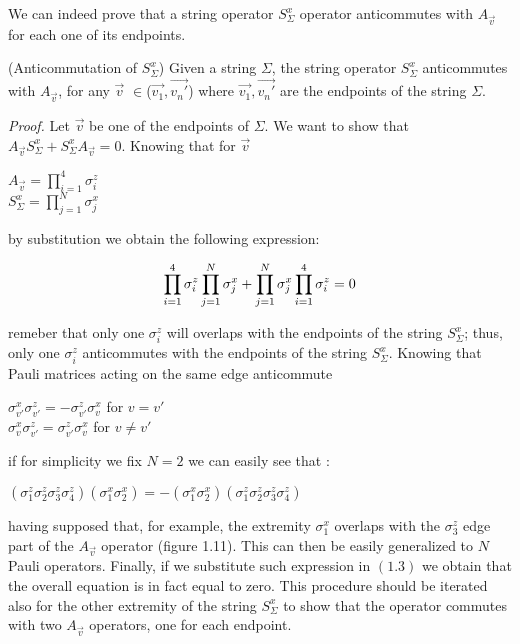 \documentclass{Configuration_Files/PoliMi3i_thesis}
\begin{document}
We can indeed prove that a string operator $S^x_\Sigma$ operator anticommutes with $A_{\vec{v}} $ for each one of its endpoints. 

\begin{proposition}(Anticommutation of $S^x_\Sigma$)
	Given a string $\Sigma$, the string operator $S^x_\Sigma$ anticommutes with $A_{\vec{v}} $, for any $\vec{v}$ $\in$($\vec{v_1},\vec{v_n'}$) where $\vec{v_1},\vec{v_n'}$ are the endpoints of the string $\Sigma$.
\end{proposition}

\textit{Proof.}\newline
Let $\vec{v}$ be one of the endpoints of $\Sigma$. We want to show that $A_{\vec{v}} S^x_\Sigma + S^x_\Sigma A_{\vec{v}}=0$. Knowing that for $\vec{v}$

\begin{center}
	$A_{\vec{v}} = \prod_{i=1}^{4} \sigma_i^z$ \\ 
	$S^x_\Sigma = \prod_{j=1}^{N} \sigma_j^x$
\end{center}

by substitution we obtain the following expression: 

\begin{equation}
	\space\prod_{i=1}^{4} \sigma_i^z \prod_{j=1}^{N} \sigma_j^x + \prod_{j=1}^{N} \sigma_j^x \prod_{i=1}^{4} \sigma_i^z = 0  
\end{equation}

remeber that only one $\sigma_i^z$ will overlaps with the endpoints of the string $S^x_\Sigma$; thus, only one $\sigma_i^z$ anticommutes with the endpoints of the string $S^x_\Sigma$. Knowing that Pauli matrices acting on the same edge anticommute

\begin{center}
	$\sigma_{v'}^x \sigma_{v'}^z = - \sigma_{v'}^z \sigma_v^x$ for $v=v'$ \\
	$\sigma_v^x \sigma_{v'}^z =  \sigma_{v'}^z \sigma_v^x$ for $v \neq v'$ 
\end{center}

if for simplicity we fix $N=2$ we can easily see that :

\begin{center}
	$(\sigma_1^z \sigma_2^z \sigma_3^z \sigma_4^z)(\sigma_1^x \sigma_2^x)  = - (\sigma_1^x \sigma_2^x)(\sigma_1^z \sigma_2^z \sigma_3^z \sigma_4^z) $ 
\end{center}

having supposed that, for example, the extremity $\sigma_1^x$ overlaps with the $\sigma_3^z$ edge part of the $A_{\vec{v}} $ operator (figure 1.11). This can then be easily generalized to $N$ Pauli operators. Finally, if we substitute such expression in $(1.3)$ we obtain that the overall equation is in fact equal to zero. \newline
This procedure should be iterated also for the other extremity of the string $S^x_\Sigma$ to show that the operator commutes with two $A_{\vec{v}} $ operators, one for each endpoint.
\end{document}
